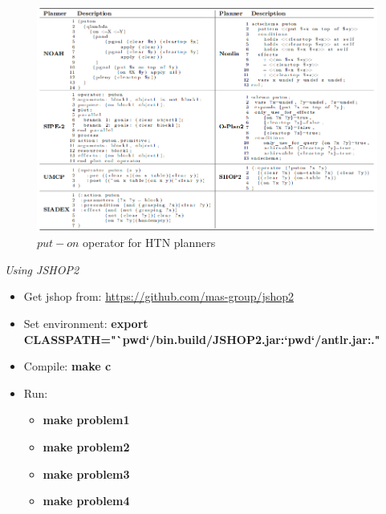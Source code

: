 \documentclass{beamer}
\begin{document}
	\begin{frame}
		
		\begin{figure}
			\centering
			\includegraphics[width=1\linewidth]{../Report/images/jshop}
			\caption{$put-on$ operator for HTN planners \cite{Georgievski2014}}
			\label{fig:jshop}
		\end{figure}
		
	\end{frame}
	
	\begin{frame}{\textsl{Using JSHOP2}}
		\begin{itemize}
			\item Get jshop from: \url{https://github.com/mas-group/jshop2}
			\item Set environment: \textbf{ \small export CLASSPATH="`pwd`/bin.build/JSHOP2.jar:`pwd`/antlr.jar:."}
			\item Compile: \textbf{{\small make c}}
			\item Run:
			\begin{itemize}
				\item \textbf{\small make problem1} 
				\item \textbf{\small make problem2}
				\item \textbf{\small make problem3} 
				\item \textbf{\small make problem4}
			\end{itemize} 

		\end{itemize}
		
	\end{frame}
	
\end{document}
